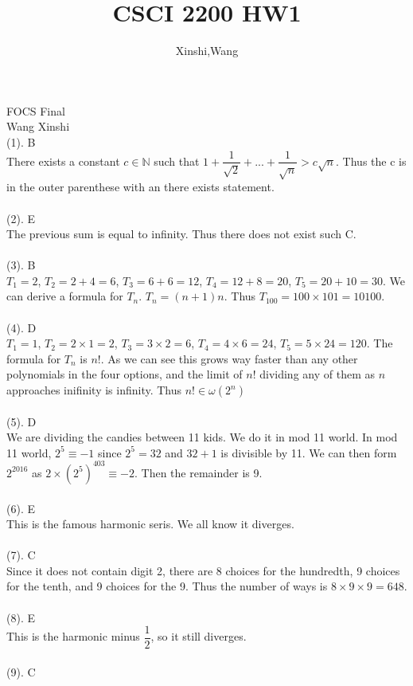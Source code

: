 \documentclass{article}
\title{CSCI 2200 HW1}
\author{Xinshi,Wang}
\begin{document}
	\noindent
	FOCS Final \\
	Wang Xinshi\\
	
	\noindent (1). B\\
	There exists a constant $c \in \mathbb{N}$ such that $1+\dfrac{1}{\sqrt 2}+...+\dfrac{1}{\sqrt{n}}>c\sqrt{n}$. Thus the c is in the outer parenthese with an there exists statement.\\\\
	(2). E\\
	The previous sum is equal to infinity. Thus there does not exist such C.\\\\
	(3). B\\
	$T_1 = 2$, $T_2=2+4=6$, $T_3=6+6=12$, $T_4=12+8=20$, $T_5=20+10=30$. We can derive a formula for $T_n$. $T_n = (n+1)n$. Thus $T_100 = 100 \times 101 = 10100$.\\\\
	(4). D\\
	$T_1 = 1$, $T_2 = 2 \times 1 = 2$, $T_3 = 3 \times 2 = 6$, $T_4 = 4 \times 6 = 24$, $T_5 = 5 \times 24 = 120$. The formula for $T_n$ is $n!$. As we can see this grows way faster than any other polynomials in the four options, and the limit of $n!$ dividing any of them as $n$ approaches inifinity is infinity. Thus $n! \in \omega(2^n)$\\\\
	(5). D\\ 
	We are dividing the candies between 11 kids. We do it in mod 11 world. In mod 11 world, $2^5 \equiv -1 $ since $2^5 = 32$ and $32+1$ is divisible by 11. We can then form $2^{2016}$ as $2 \times (2^{5})^{403} \equiv -2$. Then the remainder is 9. \\\\
	(6). E\\
	This is the famous harmonic seris. We all know it diverges.\\\\
	(7). C\\
	Since it does not contain digit 2, there are 8 choices for the hundredth, 9 choices for the tenth, and 9 choices for the 9. Thus the number of ways is $8 \times 9 \times 9 = 648$.\\\\
	(8). E\\
	This is the harmonic minus $\dfrac{1}{2}$, so it still diverges.\\\\
	(9). C\\
\end{document}
